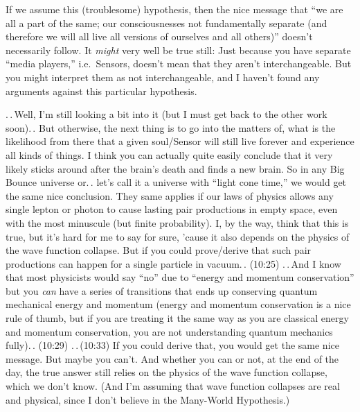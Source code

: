 \documentclass{report}
\begin{document}
If we assume this (troublesome) hypothesis, then the nice message that ``we are all a part of the same; our consciousnesses not fundamentally separate (and therefore we will all live all versions of ourselves and all others)'' doesn't necessarily follow. It \emph{might} very well be true still: Just because you have separate ``media players,'' i.e.\ Sensors, doesn't mean that they aren't interchangeable. But you might interpret them as not interchangeable, and I haven't found any arguments against this particular hypothesis.

.\,.\,Well, I'm still looking a bit into it (but I must get back to the other work soon).\,. But otherwise, the next thing is to go into the matters of, what is the likelihood from there that a given soul/Sensor will still live forever and experience all kinds of things. I think you can actually quite easily conclude that it very likely sticks around after the brain's death and finds a new brain. So in any Big Bounce universe or.\,. let's call it a universe with ``light cone time,'' we would get the same nice conclusion. They same applies if our laws of physics allows any single lepton or photon to cause lasting pair productions in empty space, even with the most minuscule (but finite probability). I, by the way, think that this is true, but it's hard for me to say for sure, 'cause it also depends on the physics of the wave function collapse. But if you could prove/derive that such pair productions can happen for a single particle in vacuum.\,. (10:25) .\,.\,And I know that most physicists would say ``no'' due to ``energy and momentum conservation'' but you \emph{can} have a series of transitions that ends up conserving quantum mechanical energy and momentum (energy and momentum conservation is a nice rule of thumb, but if you are treating it the same way as you are classical energy and momentum conservation, you are not understanding quantum mechanics fully).\,. (10:29) .\,.\,(10:33) If you could derive that, you would get the same nice message. But maybe you can't. And whether you can or not, at the end of the day, the true answer still relies on the physics of the wave function collapse, which we don't know. (And I'm assuming that wave function collapses are real and physical, since I don't believe in the Many-World Hypothesis.)
\end{document}
